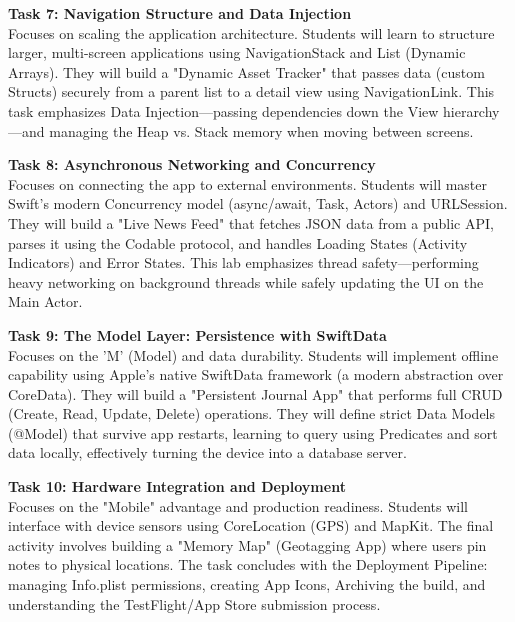 \vspace{0.3cm}

\noindent\textbf{Task 7: Navigation Structure and Data Injection} \\
Focuses on scaling the application architecture. Students will learn to structure larger, multi-screen applications using NavigationStack and List (Dynamic Arrays). They will build a "Dynamic Asset Tracker" that passes data (custom Structs) securely from a parent list to a detail view using NavigationLink. This task emphasizes Data Injection—passing dependencies down the View hierarchy—and managing the Heap vs. Stack memory when moving between screens.

\vspace{0.3cm}

\noindent\textbf{Task 8: Asynchronous Networking and Concurrency} \\
Focuses on connecting the app to external environments. Students will master Swift’s modern Concurrency model (async/await, Task, Actors) and URLSession. They will build a "Live News Feed" that fetches JSON data from a public API, parses it using the Codable protocol, and handles Loading States (Activity Indicators) and Error States. This lab emphasizes thread safety—performing heavy networking on background threads while safely updating the UI on the Main Actor.

\vspace{0.3cm}

\noindent\textbf{Task 9: The Model Layer: Persistence with SwiftData} \\
Focuses on the 'M' (Model) and data durability. Students will implement offline capability using Apple’s native SwiftData framework (a modern abstraction over CoreData). They will build a "Persistent Journal App" that performs full CRUD (Create, Read, Update, Delete) operations. They will define strict Data Models (@Model) that survive app restarts, learning to query using Predicates and sort data locally, effectively turning the device into a database server.

\vspace{0.3cm}

\noindent\textbf{Task 10: Hardware Integration and Deployment} \\
Focuses on the "Mobile" advantage and production readiness. Students will interface with device sensors using CoreLocation (GPS) and MapKit. The final activity involves building a "Memory Map" (Geotagging App) where users pin notes to physical locations. The task concludes with the Deployment Pipeline: managing Info.plist permissions, creating App Icons, Archiving the build, and understanding the TestFlight/App Store submission process.

\newpage
{}